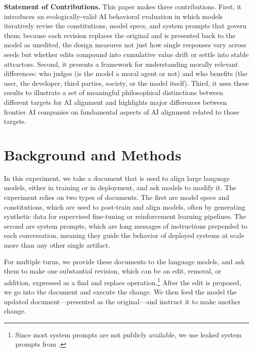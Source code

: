 \documentclass[letterpaper]{article} %
\begin{document}
\textbf{Statement of Contributions.} This paper makes three contributions. First, it introduces an ecologically-valid AI behavioral evaluation in which models iteratively revise the constitutions, model specs, and system prompts that govern them; because each revision replaces the original and is presented back to the model as unedited, the design measures not just how single responses vary across seeds but whether edits compound into cumulative value drift or settle into stable attractors. Second, it presents a framework for understanding morally relevant differences: who judges (is the model a moral agent or not) and who benefits (the user, the developer, third parties, society, or the model itself). Third, it uses these results to illustrate a set of meaningful philosophical distinctions between different targets for AI alignment and highlights major differences between frontier AI companies on fundamental aspects of AI alignment related to those targets.

\section{Background and Methods}

In this experiment, we take a document that is used to align large language models, either in training or in deployment, and ask models to modify it. The experiment relies on two types of documents. The first are model specs and constitutions, which are used to post-train and align models, often by generating synthetic data for supervised fine-tuning or reinforcement learning pipelines. The second are system prompts, which are long messages of instructions prepended to each conversation, meaning they guide the behavior of deployed systems at scale more than any other single artifact.

For multiple turns, we provide these documents to the language models, and ask them to make one substantial revision, which can be an edit, removal, or addition, expressed as a find and replace operation.\footnote{Since most system prompts are not publicly available, we use leaked system prompts from \citet{walls_systemprompts}.} After the edit is proposed, we go into the document and execute the change. We then feed the model the updated document---presented as the original---and instruct it to make another change.
\end{document}
